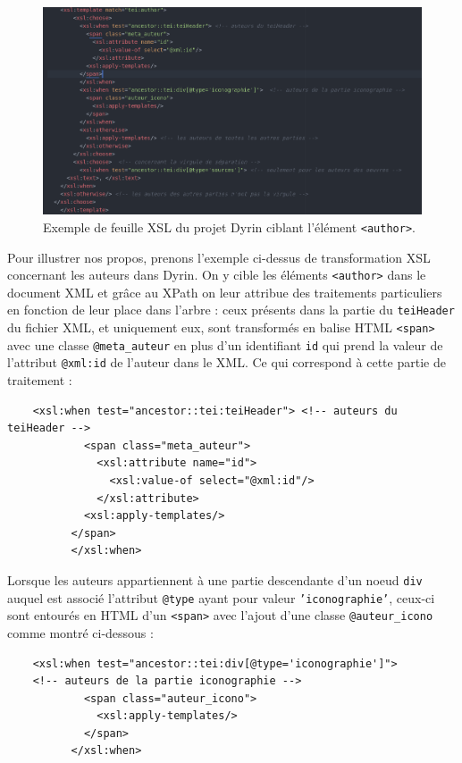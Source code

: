\documentclass[a4paper,12pt,twoside]{book}
\begin{document}
    \begin{figure}[H]
    \centering
    \includegraphics[width=12cm]{img/autre/exemple_xsl.png}
    \caption{Exemple de feuille \acrshort{XSL} du projet Dyrin ciblant l'élément \texttt{<author>}.}
\end{figure}

    Pour illustrer nos propos, prenons l'exemple ci-dessus de transformation \acrshort{XSL} concernant les auteurs dans Dyrin. On y \og cible\fg{} les éléments \texttt{<author>} dans le document XML et grâce au XPath on leur attribue des traitements particuliers en fonction de leur place dans l'arbre : ceux présents dans la partie du \texttt{teiHeader} du fichier XML, et uniquement eux, sont transformés en balise HTML \texttt{<span>} avec une classe \texttt{@meta\_auteur} en plus d'un identifiant \texttt{id} qui prend la valeur de l'attribut \texttt{@xml:id} de l'auteur dans le XML. Ce qui correspond à cette partie de traitement :
    
    \begin{verbatim}
    <xsl:when test="ancestor::tei:teiHeader"> <!-- auteurs du teiHeader -->
            <span class="meta_auteur">
              <xsl:attribute name="id">
                <xsl:value-of select="@xml:id"/>
              </xsl:attribute>
            <xsl:apply-templates/>
          </span>
          </xsl:when>
    \end{verbatim}
    
   Lorsque les auteurs appartiennent à une partie descendante d'un noeud \texttt{div} auquel est associé l'attribut \texttt{@type} ayant pour valeur \texttt{'iconographie'}, ceux-ci sont entourés en HTML d'un \texttt{<span>} avec l'ajout d'une classe \texttt{@auteur\_icono} comme montré ci-dessous :
    
    \begin{verbatim}
    <xsl:when test="ancestor::tei:div[@type='iconographie']">
    <!-- auteurs de la partie iconographie -->
            <span class="auteur_icono">
              <xsl:apply-templates/>
            </span>
          </xsl:when>
    \end{verbatim}
    
\end{document}

